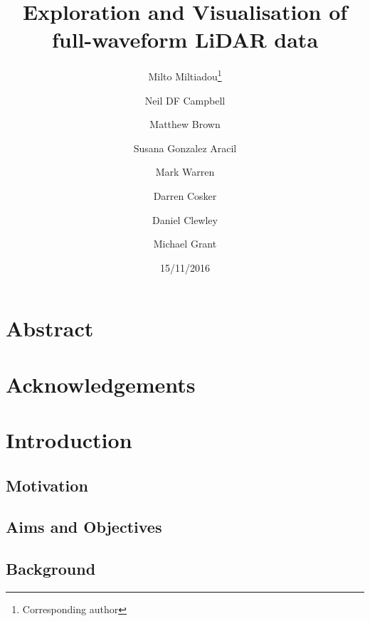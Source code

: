 \documentclass{article}
\begin{document}
\begin{titlepage}
	\title{\textbf{Exploration and Visualisation of full-waveform LiDAR data}}
	\date {15/11/2016}
	\author [1,2,3]{Milto Miltiadou\thanks{Corresponding author}}
	\author [1]{Neil DF Campbell}
	\author [1]{Matthew Brown}
	\author [3]{Susana Gonzalez Aracil}
	\author [2]{Mark Warren}
	\author [1]{Darren Cosker}
	\author [2]{ Daniel Clewley}
	\author [2]{Michael Grant}
	\renewcommand\Authands{and}
	\renewcommand{\floatpagefraction}{1}%


 \maketitle
  

\end{titlepage}

    
\newpage
	\setcounter{secnumdepth}{0}
	\section{Abstract}\label{Abstract}
		
		\newpage
	\section{Acknowledgements}\label{Acknowledgments}
		
		\newpage
    \tableofcontents	 
		\newpage  
	\setcounter{secnumdepth}{4}	
	\section{Introduction} \label{Introduction}
			
		\subsection{Motivation} \label{Motivation}
				
			\subsection{Aims and Objectives}\label{Aims}
			
		\subsection{Background}\label{Background}
			
			\newpage
\end{document}
